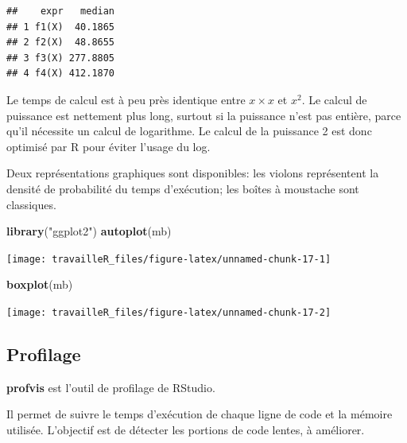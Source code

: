 \documentclass[
  12pt,
  french,
  a4paper,
  extrafontsizes,onecolumn,openright
  ]{memoir}
\newenvironment{Shaded}{\begin{snugshade}}{\end{snugshade}}
\newcommand{\KeywordTok}[1]{\textcolor[rgb]{0.13,0.29,0.53}{\textbf{#1}}}
\newcommand{\NormalTok}[1]{#1}
\newcommand{\StringTok}[1]{\textcolor[rgb]{0.31,0.60,0.02}{#1}}
\begin{document}
\begin{verbatim}
##    expr   median
## 1 f1(X)  40.1865
## 2 f2(X)  48.8655
## 3 f3(X) 277.8805
## 4 f4(X) 412.1870
\end{verbatim}

\normalsize

Le temps de calcul est à peu près identique entre \(x \times x\) et \(x^2\).
Le calcul de puissance est nettement plus long, surtout si la puissance n'est pas entière, parce qu'il nécessite un calcul de logarithme.
Le calcul de la puissance 2 est donc optimisé par R pour éviter l'usage du log.

Deux représentations graphiques sont disponibles: les violons représentent la densité de probabilité du temps d'exécution; les boîtes à moustache sont classiques.

\scriptsize

\begin{Shaded}
\begin{Highlighting}[]
\KeywordTok{library}\NormalTok{(}\StringTok{"ggplot2"}\NormalTok{)}
\KeywordTok{autoplot}\NormalTok{(mb)}
\end{Highlighting}
\end{Shaded}

\begin{center}\texttt{[image: travailleR\_files/figure-latex/unnamed-chunk-17-1]} \end{center}

\begin{Shaded}
\begin{Highlighting}[]
\KeywordTok{boxplot}\NormalTok{(mb)}
\end{Highlighting}
\end{Shaded}

\begin{center}\texttt{[image: travailleR\_files/figure-latex/unnamed-chunk-17-2]} \end{center}

\normalsize

\hypertarget{profilage}{%
\subsection{Profilage}\label{profilage}}

\textbf{profvis} est l'outil de profilage de RStudio.

Il permet de suivre le temps d'exécution de chaque ligne de code et la mémoire utilisée.
L'objectif est de détecter les portions de code lentes, à améliorer.
\end{document}
